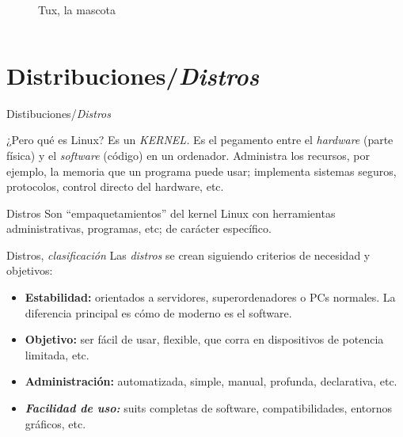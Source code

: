 \documentclass[12pt]{beamer}
\begin{document}
\begin{frame}
\begin{columns}
\begin{column}{0.5\linewidth}
\begin{figure}
				\caption{Tux, la mascota}
			\end{figure}
		\end{column}
	\end{columns}
\end{frame}

\section{Distribuciones/\textit{Distros}}
\begin{frame}{Distibuciones/\textit{Distros}}
	\begin{block}{¿Pero qué es Linux?}
		Es un \textit{KERNEL.} Es el pegamento entre el \textit{hardware} (parte física) y el \textit{software} (código) en un ordenador. Administra los recursos, por ejemplo, la memoria que un programa puede usar; implementa sistemas seguros, protocolos, control directo del hardware, etc.
	\end{block}
	\begin{block}{Distros}
		Son ``empaquetamientos'' del kernel Linux con herramientas administrativas, programas, etc; de carácter específico.
	\end{block}
\end{frame}

\begin{frame}{Distros, \textit{clasificación}}
	Las \textit{distros} se crean siguiendo criterios de necesidad y objetivos:
	\begin{itemize}
		\item \textbf{Estabilidad:} orientados a servidores, superordenadores o PCs normales. La diferencia principal es cómo de moderno es el software.
		\item \textbf{Objetivo:} ser fácil de usar, flexible, que corra en dispositivos de potencia limitada, etc.
		\item \textbf{Administración:} automatizada, simple, manual, profunda, declarativa, etc.
		\item \textbf{\textit{Facilidad de uso:}} suits completas de software, compatibilidades, entornos gráficos, etc.
	\end{itemize}
\end{frame}
\end{document}
